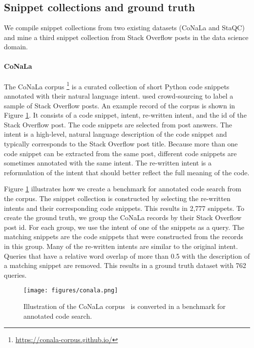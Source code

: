 \documentclass[12pt,conference, onecolumn]{IEEEtran}
\begin{document}
\subsection{Snippet collections and ground truth}
We compile snippet collections from two existing datasets (CoNaLa and StaQC) and mine a third snippet collection from Stack Overflow posts in the data science domain.

\paragraph{CoNaLa}
The CoNaLa corpus \cite{yin2018mining}\footnote{\url{https://conala-corpus.github.io/}} is a curated collection of short Python code snippets annotated with their natural language intent. \citet{yin2018mining} used crowd-sourcing to label a sample of Stack Overflow posts.  An example record of the corpus is shown in Figure \ref{fig:conala}. It consists of a code snippet, intent, re-written intent, and the id of the Stack Overflow post. The code snippets are selected from post answers. The intent is a high-level, natural language description of the code snippet and typically corresponds to the Stack Overflow post title. Because more than one code snippet can be extracted from the same post, different code snippets are sometimes annotated with the same intent. The re-written intent is a reformulation of the intent that should better reflect the full meaning of the code. 

Figure \ref{fig:conala} illustrates how we create a benchmark for annotated code search from the corpus. The snippet collection is constructed by selecting the re-written intents and their corresponding code snippets. This results in 2,777 snippets.  To create the ground truth, we group the CoNaLa records by their Stack Overflow post id. For each group, we use the intent of one of the snippets as a query. The matching snippets are the code snippets that were constructed from the records in this group. Many of the re-written intents are similar to the original intent. Queries that have a relative word overlap of more than 0.5 with the description of a matching snippet are removed. This results in a ground truth dataset with 762 queries.

\begin{figure}
\centering
\texttt{[image: figures/conala.png]}
\caption{Illustration of the CoNaLa corpus~ is converted in a benchmark for annotated code search.}\label{fig:conala}
\end{figure}
\end{document}
